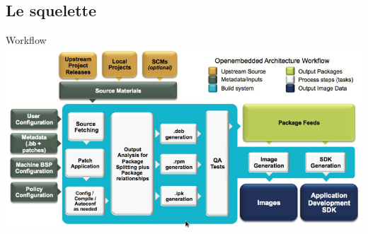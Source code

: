 \documentclass[compress]{smilebeamer}
\begin{document}
\subsection{Le squelette}
\begin{frame}{Workflow}
\includegraphics[width=\textwidth]{schemas/yocto_workflow.png}
\end{frame}
\end{document}
